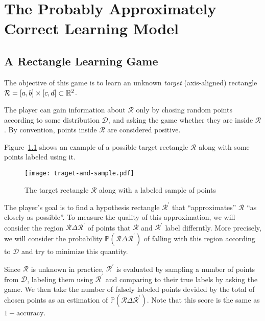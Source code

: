 \chapter{The Probably Approximately Correct Learning Model}
    \section{A Rectangle Learning Game}
    \newcommand{\rectangle}{\mathcal{R}}
    The objective of this game is to learn an unknown \emph{target} (axis-aligned) rectangle \(\rectangle = [a, b] \times [c, d] \subset \reals^2\).

    The player can gain information about \(\rectangle\) only by chosing random points according to some distribution \(\mathcal{D}\), and asking the game whether they are inside \(\rectangle\). By convention, points inside \(\rectangle\) are considered positive.

    Figure~\ref{fig:traget-and-sample} shows an example of a possible target rectangle \(\rectangle\) along with some points labeled using it.

    \begin{figure}
        \begin{center}
            \texttt{[image: traget-and-sample.pdf]}  
        \end{center}
        \caption{The target rectangle \(\rectangle\) along with a labeled sample of points}
        \label{fig:traget-and-sample}
    \end{figure}
    
    The player's goal is to find a hypothesis rectangle \(\rectangle^\prime\) that ``approximates'' \(\rectangle\) ``as closely as possible''. To measure the quality of this approximation, we will consider the region \(\rectangle\Delta\rectangle^\prime\) of points that \(\rectangle\) and \(\rectangle^\prime\) label differntly. More precisely, we will consider the probability \(\mathbb{P}(\rectangle\Delta\rectangle^\prime)\) of falling with this region according to \(\mathcal{D}\) and try to minimize this quantity.

    Since \(\rectangle\) is unknown in practice, \(\rectangle^\prime\) is evaluated by sampling a number of points from \(\mathcal{D}\), labeling them using \(\rectangle^\prime\) and comparing to their true labels by asking the game. We then take the number of falsely labeled points devided by the total of chosen points as an estimation of \(\mathbb{P}(\rectangle\Delta\rectangle^\prime)\).
    Note that this score is the same as \(1 - \mathrm{accuracy}\).

